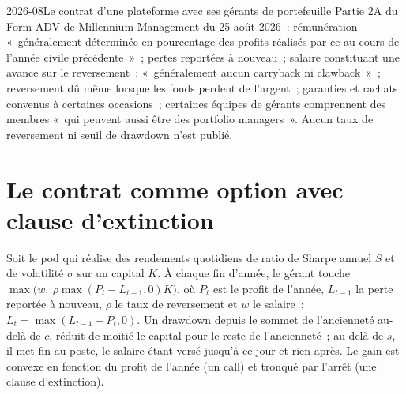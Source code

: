 \begin{dated}{2026-08}{Le contrat d'une plateforme avec ses gérants de portefeuille}\label{dat:in:portfolio-manager-and-pod-analyst:deal}
Partie 2A du Form ADV de Millennium Management du 25 août 2026~: rémunération «~généralement déterminée en pourcentage des profits réalisés
par ce  au cours de l'année civile précédente~»~; pertes reportées à nouveau~; salaire constituant une avance sur le
reversement~; «~généralement aucun \textquotedbl carryback\textquotedbl{} ni \textquotedbl clawback\textquotedbl~»~; reversement dû même
lorsque les fonds perdent de l'argent~; garanties et rachats convenus à certaines occasions~; certaines équipes de gérants comprennent des membres
«~qui peuvent aussi être des \textquotedbl portfolio managers\textquotedbl~». Aucun taux de reversement ni seuil de drawdown n'est publié.
\end{dated}

\section{Le contrat comme option avec clause d'extinction}

\begin{method}\label{met:in:portfolio-manager-and-pod-analyst:deal}
Soit le pod qui réalise des rendements quotidiens de ratio de Sharpe annuel $S$ et de volatilité $\sigma$ sur un capital $K$. À chaque fin d'année, le
gérant touche $\max\bigl(w,\ \rho\max(P_t-L_{t-1},0)K\bigr)$, où $P_t$ est le profit de l'année, $L_{t-1}$ la
perte reportée à nouveau, $\rho$ le taux de reversement et $w$ le salaire~; $L_t=\max(L_{t-1}-P_t,0)$. Un drawdown depuis le sommet de l'ancienneté
au-delà de $c$, réduit de moitié le capital pour le reste de l'ancienneté~; au-delà de $s$, il met fin au poste, le salaire étant versé jusqu'à
ce jour et rien après. Le gain est convexe en fonction du profit de l'année (un call) et tronqué par l'arrêt (une clause d'extinction).
\end{method}

